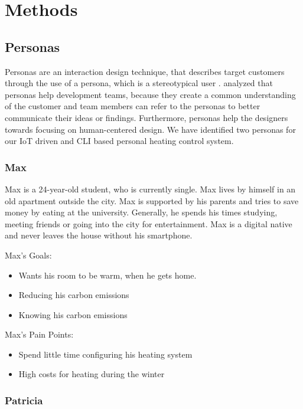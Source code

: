 \documentclass[]{interact}
\theoremstyle{plain}%
\theoremstyle{definition}
\theoremstyle{remark}
\begin{document}
\section*{Methods}
\subsection*{Personas}

Personas are an interaction design technique, that describes target customers through the use of a persona, which is a stereotypical user \citep*{pruitt_personas_2003}.
\citeauthor*{pruitt_personas_2003} analyzed that personas help development teams, because they create a common understanding of the customer and team members can refer to the personas to better communicate their ideas or findings.
Furthermore, personas help the designers towards focusing on human-centered design.
We have identified two personas for our IoT driven and CLI based personal heating control system.

\subsubsection*{Max}

Max is a 24-year-old student, who is currently single. Max lives by himself in an old apartment outside the city.
Max is supported by his parents and tries to save money by eating at the university. Generally, he spends his times studying, meeting friends or going into the city for entertainment.
Max is a digital native and never leaves the house without his smartphone.

Max's Goals:
\begin{itemize}
  \item Wants his room to be warm, when he gets home.
  \item Reducing his carbon emissions
  \item Knowing his carbon emissions
\end{itemize}

Max's Pain Points:
\begin{itemize}
  \item Spend little time configuring his heating system
  \item High costs for heating during the winter
\end{itemize}

\subsubsection*{Patricia}
\end{document}

